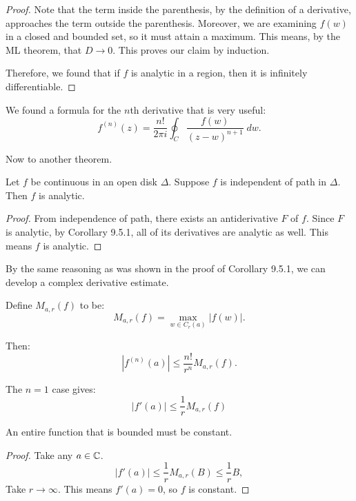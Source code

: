 \begin{proof}
    Note that the term inside the parenthesis, by the definition of a derivative, approaches the term outside the parenthesis.
    Moreover, we are examining $f(w)$ in a closed and bounded set, so it must attain a maximum.
    This means, by the ML theorem, that $D \to 0$.
    This proves our claim by induction.

    Therefore, we found that if $f$ is analytic in a region, then it is infinitely differentiable.


\end{proof}

We found a formula for the $n$th derivative that is very useful:
\[ f^{(n)} (z) = \frac{n!}{2\pi i} \oint_{C} \frac{f(w)}{(z-w)^{n+1}} \; dw. \]

Now to another theorem.
\begin{theorem}
    Let $f$ be continuous in an open disk $\Delta$.
    Suppose $f$ is independent of path in $\Delta$.
    Then $f$ is analytic.
\end{theorem}

\begin{proof}
    From independence of path, there exists an antiderivative $F$ of $f$.
    Since $F$ is analytic, by Corollary 9.5.1, all of its derivatives are analytic as well.
    This means $f$ is analytic.
\end{proof}

By the same reasoning as was shown in the proof of Corollary 9.5.1, we can develop a complex derivative estimate.
\begin{definition}
    Define $M_{a,r} (f)$ to be:
    \[ M_{a,r}(f) = \max_{w \in C_r(a)} |f(w)|.\]
\end{definition}

Then:
\[ |f^{(n)}(a)| \le \frac{n!}{r^n} M_{a,r}(f). \]

\begin{cor}
    The $n = 1$ case gives:
    \[ |f'(a) | \le \frac{1}{r} M_{a,r}(f) \]
\end{cor}

\begin{cor}
    An entire function that is bounded must be constant.
\end{cor}

\begin{proof}
    Take any $a \in \operatorname{\mathbb{C}}$.
    \[ |f'(a)| \le \frac{1}{r} M_{a,r}(B) \le \frac{1}{r}B, \]
    Take $r \to \infty$.
    This means $f'(a) = 0$, so $f$ is constant.
\end{proof}

